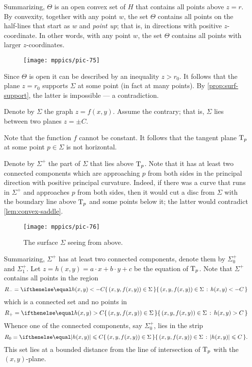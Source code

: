 Summarizing, $\Theta$ is an open convex set of $H$ that contains all points above $z=r$.
By convexity, together with any point $w$, the set $\Theta$ contains all points on the half-lines that start as $w$ and {}\emph{point up}; that is, in directions with positive $z$-coordinate. 
In other words, with any point $w$,
the set $\Theta$ contains all points with larger $z$-coordinates.
\begin{figure}[!ht]
\vskip-0mm
\centering
\texttt{[image: mppics/pic-75]}
\vskip0mm
\end{figure}
Since $\Theta$ is open it can be described by an inequality $z>r_0$.
It follows that the plane $z=r_0$ supports $\Sigma$ at some point (in fact at many points).
By \ref{prop:surf-support}, the latter is impossible --- a contradiction.
\qeds

Denote by $\Sigma$ the graph $z=f(x,y)$.
Assume the contrary; that is, $\Sigma$ lies between two planes $z=\pm C$.

Note that the function $f$ cannot be constant.
It follows that the tangent plane $\mathrm{T}_p$ at some point $p\in\Sigma$ is not horizontal.

Denote by $\Sigma^+$ the part of $\Sigma$ that lies above $\mathrm{T}_p$.
Note that it has at least two connected components which are approaching $p$ from both sides 
in the principal direction with positive principal curvature.
Indeed, if there was a curve that runs in $\Sigma^+$ and approaches $p$ from both sides, then it would cut a disc from $\Sigma$ with the boundary line above $\mathrm{T}_p$ and some points below it;
the latter would contradict \ref{lem:convex-saddle}.

\begin{figure}[!ht]
\vskip-0mm
\centering
\texttt{[image: mppics/pic-76]}
\caption*{The surface $\Sigma$ seeing from above.}
\vskip0mm
\end{figure}

Summarizing, $\Sigma^+$ has at least two connected components, denote them by $\Sigma^+_0$ and $\Sigma^+_1$.
Let $z=h(x,y)=a\cdot x+b\cdot y+c$ be the equation of $\mathrm{T}_p$.
Note that $\Sigma^+$ contains all points in the region
\[R_-=\set{(x,y,f(x,y))\in\Sigma}{h(x,y)< -C}\] 
which is a connected set and no points in 
\[R_+=\set{(x,y,f(x,y))\in\Sigma}{h(x,y)> C}\]
Whence one of the connected components, say $\Sigma^+_0$, lies in the strip
\[R_0=\set{(x,y,f(x,y))\in\Sigma}{|h(x,y)|\le  C}.\]
This set lies at a bounded distance from the line of intersection of $\mathrm{T}_p$ with the $(x,y)$-plane.

